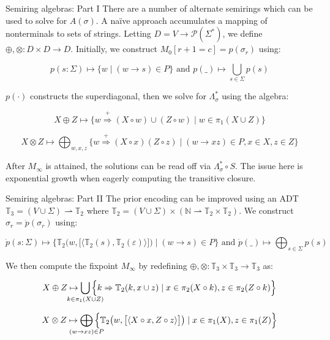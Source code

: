 \documentclass{beamer}
\begin{document}
\begin{frame}[fragile]{Semiring algebras: Part I}
There are a number of alternate semirings which can be used to solve for $A(\sigma)$. A na\"ive approach accumulates a mapping of nonterminals to sets of strings. Letting $D = V \rightarrow \mathcal{P}(\Sigma^*)$, we define $\oplus, \otimes: D \times D \rightarrow D$. Initially, we construct $M_0[r+1=c] = p(\sigma_r)$ using:

\begin{equation*}
p(s: \Sigma) \mapsto \{w \mid (w \rightarrow s)\in P\} \text{ and } p(\_) \mapsto \bigcup_{s\in \Sigma} p(s)
\end{equation*}

$p(\cdot)$ constructs the superdiagonal, then we solve for $\Lambda_\sigma^*$ using the algebra:

\begin{equation*}
X \oplus Z \mapsto \big\{w \stackrel{+}{\Rightarrow} (X \circ w) \cup (Z \circ w) \mid w \in \pi_1(X \cup Z)\big\}
\end{equation*}

\begin{equation*}
X \otimes Z \mapsto \bigoplus_{w, x, z}\big\{w \stackrel{+}{\Rightarrow} (X\circ x)(Z\circ z) \mid (w\rightarrow xz) \in P, x\in X, z\in Z\big\}
\end{equation*}

\noindent After $M_\infty$ is attained, the solutions can be read off via $\Lambda_\sigma^* \circ S$. The issue here is exponential growth when eagerly computing the transitive closure.
\end{frame}

\begin{frame}[fragile]{Semiring algebras: Part II}
The prior encoding can be improved using an ADT $\mathbb{T}_3 = (V \cup \Sigma) \rightharpoonup \mathbb{T}_2$ where $\mathbb{T}_2 = (V \cup \Sigma) \times (\mathbb{N} \rightharpoonup \mathbb{T}_2\times\mathbb{T}_2)$. We construct $\hat\sigma_r = \dot{p}(\sigma_r)$ using:

\begin{equation*}
\dot{p}(s: \Sigma) \mapsto \Big\{\mathbb{T}_2\big(w, \big[\langle\mathbb{T}_2(s), \mathbb{T}_2(\varepsilon)\rangle\big]\big) \mid (w \rightarrow s)\in P\Big\} \text{ and } \dot{p}(\_) \mapsto \bigoplus_{s\in \Sigma} p(s)
\end{equation*}

\noindent We then compute the fixpoint $M_\infty$ by redefining $\oplus, \otimes: \mathbb{T}_3 \times \mathbb{T}_3 \rightarrow \mathbb{T}_3$ as:

\begin{equation*}
X \oplus Z \mapsto \bigcup_{\mathclap{k\in \pi_1(X \cup Z)}}\Big\{k \Rightarrow \mathbb{T}_2(k, x \cup z) \mid x \in \pi_2(X\circ k), z \in \pi_2(Z\circ k)\Big\}
\end{equation*}

\begin{equation*}
X \otimes Z \mapsto \bigoplus_{\mathclap{(w\rightarrow xz) \in P}}\Big\{\mathbb{T}_2\big(w, \big[\langle X\circ x, Z\circ z\rangle\big]\big) \mid x \in \pi_1(X), z \in \pi_1(Z)\Big\}
\end{equation*}
\end{frame}
\end{document}
